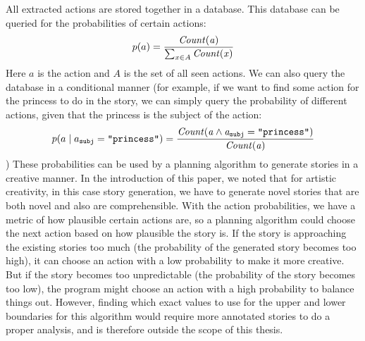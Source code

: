 All extracted actions are stored together in a database. This database can be
queried for the probabilities of certain actions: $$p(a) =
\frac{\it{Count}(a)}{\sum_{x \in A}\it{Count}(x)}$$
Here $a$ is the action and $A$ is the set of all seen actions.
We can also query the database in a conditional manner (for
example, if we want to find some action for the princess to do in the story, we
can simply query the probability of different actions, given that the princess
is the subject of the action:
$$p(a \mid a_{\texttt{subj}}=\texttt{"princess"}) = 
\frac{\it{Count}(a \land a_{\texttt{subj}}=\texttt{"princess"})}{\it{Count}(a)}$$)
These probabilities can be used by a planning algorithm to generate stories in a
creative manner. In the introduction of this paper, we noted that for artistic
creativity, in this case story generation, we have to generate novel stories
that are both novel and also are comprehensible. With the action probabilities,
we have a metric of how plausible certain actions are, so a planning algorithm
could choose the next action based on how plausible the story is. If the story
is approaching the existing stories too much (the probability of the
generated story becomes too high), it can choose an action with a
low probability to make it more creative. But if the story becomes too
unpredictable (the probability of the story becomes too low), the program might
choose an action with a high probability to balance things out. However, finding
which exact values to use for the upper and lower boundaries for this algorithm
would require more annotated stories to do a proper analysis, and is therefore
outside the scope of this thesis.
